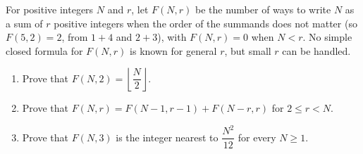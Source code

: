 For positive integers $N$ and $r$, let $F(N,r)$ be the number of ways to write $N$ as a sum of $r$ positive integers when the order of the summands does not matter (so $F(5,2)=2$, from $1+4$ and $2+3$), with $F(N,r)=0$ when $N<r$. No simple closed formula for $F(N,r)$ is known for general $r$, but small $r$ can be handled.
\begin{enumerate}
\item[(a)] Prove that $F(N,2)=\left\lfloor\dfrac {N}{2}\right\rfloor$.
\item[(b)] Prove that $F(N,r)=F(N-1,r-1)+F(N-r,r)$ for $2\le r<N$.
\item[(c)] Prove that $F(N,3)$ is the integer nearest to $\dfrac{N^2}{12}$ for every $N\ge1$.
\end{enumerate}
